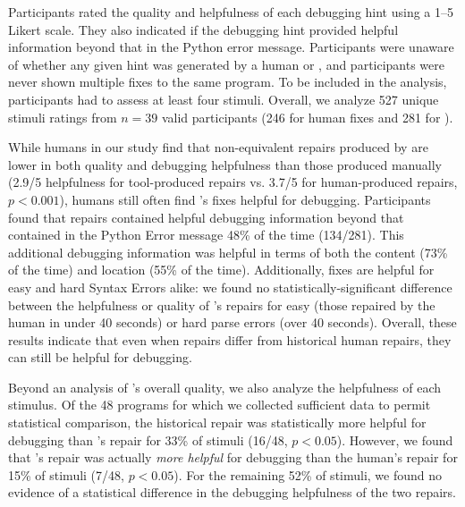 Participants rated the quality and
helpfulness of each debugging hint using a 1--5 Likert scale. They also indicated
if the debugging hint provided helpful information beyond that in the Python
error message.
Participants were unaware of whether any given hint was generated by a human or
\toolname, and participants were never shown multiple
fixes to the same program. To be included in the analysis, participants
had to assess at least four stimuli. Overall, we analyze 527 unique stimuli
ratings from $n=39$ valid participants (246 for human fixes and 281 for
\toolname).

 While humans in our study find that non-equivalent
repairs produced by \toolname are lower in both quality and debugging
helpfulness than those produced manually (2.9/5 helpfulness for tool-produced
repairs vs. 3.7/5 for human-produced repairs, $p < 0.001$), humans still often
find \toolname's fixes helpful for debugging. Participants found that \toolname
repairs contained helpful debugging information beyond that contained in the
Python Error message 48\% of the time (134/281). This additional debugging
information was helpful in terms of both the content (73\% of the time) and
location (55\% of the time). Additionally, \toolname fixes are helpful for easy
and hard Syntax Errors alike: we found no statistically-significant difference
between the helpfulness or quality of \toolname's repairs for easy (those
repaired by the human in under 40 seconds) or hard parse errors (over 40
seconds).
Overall, these results indicate that even when \toolname repairs differ from
historical human repairs, they can still be helpful for debugging.

 Beyond an analysis of \toolname's overall quality, we also
analyze the helpfulness of each stimulus. %
Of the 48 programs for which we collected sufficient data to permit statistical
comparison, the historical repair was statistically more helpful for debugging
than \toolname's repair for 33\% of stimuli (16/48, $p<0.05$). However, we found
that \toolname's repair was actually \emph{more helpful} for debugging than the
human's repair for 15\% of stimuli (7/48, $p<0.05$). For the remaining 52\% of
stimuli, we found no evidence of a statistical difference in the debugging
helpfulness of the two repairs.

